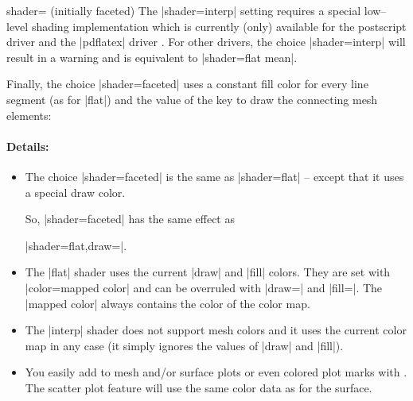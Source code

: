 \begin{pgfplotskey}{shader= (initially faceted)}
	The |shader=interp| setting requires a special low--level shading implementation which is currently (only) available for the postscript driver  and the |pdflatex| driver . For other drivers, the choice |shader=interp| will result in a warning and is equivalent to |shader=flat mean|. 
	


	Finally, the choice |shader=faceted| uses a constant fill color for every line segment (as for |flat|) and the value of the key  to draw the connecting mesh elements:
\pgfplotsexpensiveexample
\begin{codeexample}[]
\end{codeexample}


	\paragraph{Details:}
	\begin{itemize}
		\item The choice |shader=faceted| is the same as |shader=flat| -- except that it uses a special draw color.
		
		So, |shader=faceted| has the same effect as 
		
		|shader=flat,draw=|.

		\item The |flat| shader uses the current |draw| and |fill| colors. They are set with |color=mapped color| and can be overruled with |draw=| and |fill=|. The |mapped color| always contains the color of the color map. 
		
		\item The |interp| shader does not support mesh colors and it uses the current color map in any case (it simply ignores the values of |draw| and |fill|).

		\item You easily add  to mesh and/or surface plots or even colored plot marks with . The scatter plot feature will use the same color data as for the surface.


\end{itemize}
\end{pgfplotskey}
